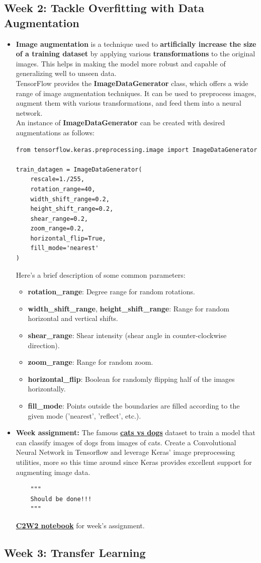 \documentclass[20pt]{article}
\newcommand{\speciallink}[2]{\textbf{\textcolor{red}{\href{#1}{#2}}}}
\begin{document}
	\subsection{Week 2: Tackle Overfitting with Data Augmentation}
	\begin{itemize}
		\item \textbf{Image augmentation} is a technique used to \textbf{artificially increase the size of a training dataset} by applying various \textbf{transformations} to the original images. This helps in making the model more robust and capable of generalizing well to unseen data.\\
		TensorFlow provides the \textbf{ImageDataGenerator} class, which offers a wide range of image augmentation techniques. It can be used to preprocess images, augment them with various transformations, and feed them into a neural network.\\
		An instance of \textbf{ImageDataGenerator} can be created with desired augmentations as follows:
		\begin{verbatim}
from tensorflow.keras.preprocessing.image import ImageDataGenerator

train_datagen = ImageDataGenerator(
	rescale=1./255,
	rotation_range=40,
	width_shift_range=0.2,
	height_shift_range=0.2,
	shear_range=0.2,
	zoom_range=0.2,
	horizontal_flip=True,
	fill_mode='nearest'
)
		\end{verbatim}
		Here's a brief description of some common parameters:
		\begin{itemize}
			\item \textbf{rotation\_range}: Degree range for random rotations.
			\item \textbf{width\_shift\_range}, \textbf{height\_shift\_range}: Range for random horizontal and vertical shifts.
			\item \textbf{shear\_range}: Shear intensity (shear angle in counter-clockwise direction).
			\item \textbf{zoom\_range}: Range for random zoom.
			\item \textbf{horizontal\_flip}: Boolean for randomly flipping half of the images horizontally.
			\item \textbf{fill\_mode}: Points outside the boundaries are filled according to the given mode ('nearest', 'reflect', etc.).
		\end{itemize}
		\item \textbf{Week assignment:}
		The famous \underline{\textbf{cats vs dogs}} dataset to train a model that can classify images of dogs from images of cats. Create a Convolutional Neural Network in Tensorflow and leverage Keras' image preprocessing utilities, more so this time around since Keras provides excellent support for augmenting image data.
		\begin{verbatim}
	"""
	Should be done!!!
	"""
		\end{verbatim}
		\speciallink{https://drive.google.com/file/d/1JNBMLpp1g1mV0Si3-v9yWOUR6RE38esN/view?usp=drive_link}{C2W2 notebook} for week's assignment.
	\end{itemize}
	\subsection{Week 3: Transfer Learning}
\end{document}
